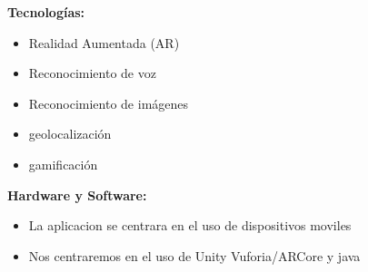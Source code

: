 \documentclass{article}
\begin{document}
\vspace*{1\baselineskip}

\textbf{Tecnologías:}
	\begin{itemize}
		\item Realidad Aumentada (AR)
		\item Reconocimiento de voz
		\item Reconocimiento de imágenes
		\item geolocalización
		\item gamificación
	  \end{itemize}

\vspace*{1\baselineskip}

\textbf{Hardware y Software:}
	\begin{itemize}
	\item La aplicacion se centrara en el uso de dispositivos moviles
	\item Nos centraremos en el uso de Unity Vuforia/ARCore y java 
  \end{itemize}





  
  
  
\pagebreak



\clearpage
\end{document}
